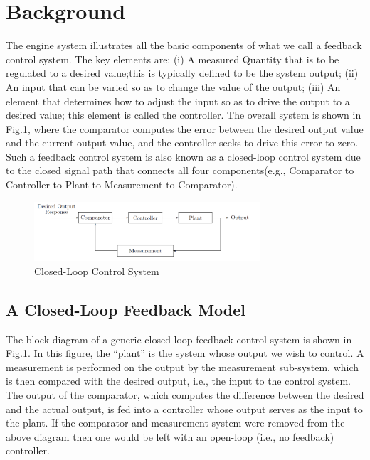 \documentclass{article}
\begin{document}
\section{Background}
{
    The engine system illustrates all the basic components of what we call a feedback control system. The key elements are: (i) A measured Quantity that is to be regulated to a desired value;this is typically defined to be the system output; (ii) An input that can be varied so as to change the value of the output; (iii) An element that determines how to adjust the input so as to drive the output to a desired value; this element is called the controller. The overall system is shown in Fig.1, where the comparator computes the error between the desired output value and the current output value, and the controller seeks to drive this error to zero. Such a feedback control system is also known as a closed-loop control system due to the closed signal path that connects all four components(e.g., Comparator to Controller to Plant to Measurement to Comparator).
    \begin{figure}[H]
        \centering
        \includegraphics[width=0.75\textwidth]{figures/lab3_1.png}
        \caption{Closed-Loop Control System}
        \label{fig:bcg}
    \end{figure}
    \subsection{A Closed-Loop Feedback Model}
    {
        The block diagram of a generic closed-loop feedback control system is shown in Fig.1. In this figure, the “plant” is the system whose output we wish to control. A measurement is performed on the output by the measurement sub-system, which is then compared with the desired output, i.e., the input to the control system. The output of the comparator, which computes the difference between the desired and the actual output, is fed into a controller whose output serves as the input to the plant. If the comparator and measurement system were removed from the above diagram then one would be left with an open-loop (i.e., no feedback) controller.
    }
}
\end{document}
